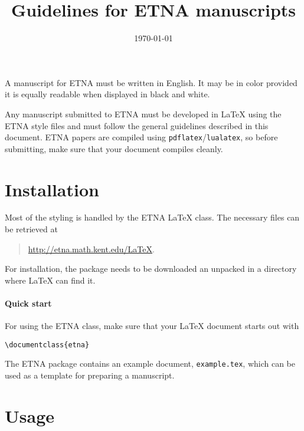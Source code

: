 \documentclass[parskip=half]{scrartcl}
\title{Guidelines for ETNA manuscripts}
\date{\today}
\begin{document}
\maketitle


A manuscript for ETNA must be written in English. It may be in color provided
it is equally readable when displayed in black and white.

Any manuscript submitted to ETNA must be developed in \LaTeX{} using the ETNA
style files and must follow the general guidelines described in this document.
ETNA papers are compiled using \texttt{pdflatex}/\texttt{lualatex}, so before
submitting, make sure that your document compiles cleanly.

\section{Installation}

Most of the styling is handled by the ETNA \LaTeX{} class. The necessary files
can be retrieved at
\begin{quote}
\url{http://etna.math.kent.edu/LaTeX}.
\end{quote}
For installation, the package needs to be downloaded an unpacked in a directory
where \LaTeX{} can find it.

\paragraph{Quick start}
For using the ETNA class, make sure that your \LaTeX{} document starts out with
\begin{verbatim}
\documentclass{etna}
\end{verbatim}
The ETNA package contains an example document,
\texttt{example.tex}, which can be used as a template for preparing a
manuscript.

\section{Usage}
\end{document}
